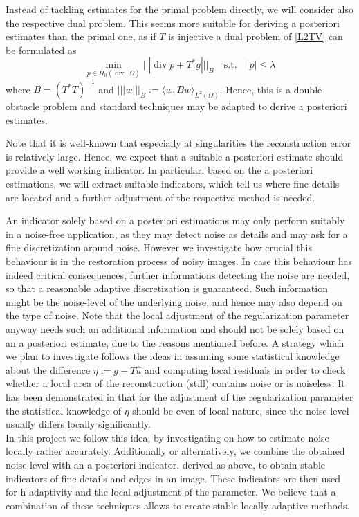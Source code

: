 \documentclass[enabledeprecatedfontcommands,cleardoublepage=empty,headsepline,twoside,11pt,DIV=15,BCOR=12mm,final]{scrartcl}
\begin{document}
Instead of tackling estimates for the primal problem directly, we will consider also the respective dual problem. This seems more suitable for deriving a posteriori estimates than the primal one, as if $T$ is injective a dual problem of \eqref{L2TV} can be formulated as
$$
\min_{p\in H_0(\operatorname{div},\Omega)} ||| \operatorname{div} p + T^*g|||_{B} \quad \text{s.t.} \quad |p|\leq \lambda
$$
where $B=(T^*T)^{-1}$ and $||| w |||_B := \langle w, B w \rangle_{L^2(\Omega)}$. Hence, this is a  double obstacle problem and standard techniques may be adapted to derive a posteriori estimates. %

Note that it is well-known that especially at singularities the reconstruction error is relatively large. Hence, we expect that a suitable a posteriori estimate should provide a well working indicator. In particular, based on the a posteriori estimations, we will extract suitable indicators, which tell us where fine details are located and a further adjustment of the respective method is needed.

An indicator solely based on a posteriori estimations may only perform suitably in a noise-free application, as they may detect noise as details and may ask for a fine discretization around noise. However we investigate how crucial this behaviour is in the restoration process of noisy images. In case this behaviour has indeed critical consequences, further informations detecting the noise are needed, so that a reasonable adaptive discretization is guaranteed. Such information might be the noise-level of the underlying noise, and hence may also depend on the type of noise. Note that the local adjustment of the regularization parameter anyway needs such an additional information and should not be solely based on an a posteriori estimate, due to the reasons mentioned before. A strategy which we plan to investigate follows the ideas in \cite{Lan, Lan} assuming some statistical knowledge about the difference $\eta:= g- T \hat{u}$ and computing local residuals in order to check whether a local area of the reconstruction (still) contains noise or is noiseless. It has been demonstrated in \cite{Lan} that for the adjustment of the regularization parameter the statistical knowledge of $\eta$ should be even of local nature, since the noise-level usually differs locally significantly.\\
In this project we follow this idea, by investigating on how to estimate noise locally rather accurately. Additionally or alternatively, we combine the obtained noise-level with an a posteriori indicator, derived as above, to obtain stable indicators of fine details and edges in an image. These indicators are then used for h-adaptivity and the local adjustment of the parameter. We believe that a combination of these techniques allows to create stable locally adaptive methods.
 
\end{document}
